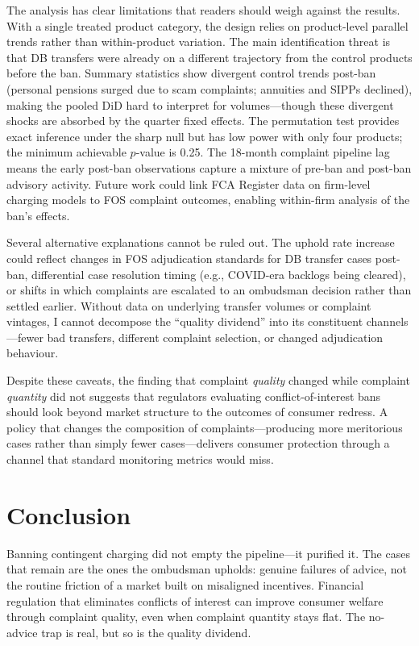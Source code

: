 \documentclass[12pt]{article}
\begin{document}
The analysis has clear limitations that readers should weigh against the results. With a single treated product category, the design relies on product-level parallel trends rather than within-product variation. The main identification threat is that DB transfers were already on a different trajectory from the control products before the ban. Summary statistics show divergent control trends post-ban (personal pensions surged due to scam complaints; annuities and SIPPs declined), making the pooled DiD hard to interpret for volumes---though these divergent shocks are absorbed by the quarter fixed effects. The permutation test provides exact inference under the sharp null but has low power with only four products; the minimum achievable $p$-value is 0.25. The 18-month complaint pipeline lag means the early post-ban observations capture a mixture of pre-ban and post-ban advisory activity. Future work could link FCA Register data on firm-level charging models to FOS complaint outcomes, enabling within-firm analysis of the ban's effects.

Several alternative explanations cannot be ruled out. The uphold rate increase could reflect changes in FOS adjudication standards for DB transfer cases post-ban, differential case resolution timing (e.g., COVID-era backlogs being cleared), or shifts in which complaints are escalated to an ombudsman decision rather than settled earlier. Without data on underlying transfer volumes or complaint vintages, I cannot decompose the ``quality dividend'' into its constituent channels---fewer bad transfers, different complaint selection, or changed adjudication behaviour.

Despite these caveats, the finding that complaint \textit{quality} changed while complaint \textit{quantity} did not suggests that regulators evaluating conflict-of-interest bans should look beyond market structure to the outcomes of consumer redress. A policy that changes the composition of complaints---producing more meritorious cases rather than simply fewer cases---delivers consumer protection through a channel that standard monitoring metrics would miss.


\section{Conclusion}

Banning contingent charging did not empty the pipeline---it purified it. The cases that remain are the ones the ombudsman upholds: genuine failures of advice, not the routine friction of a market built on misaligned incentives. Financial regulation that eliminates conflicts of interest can improve consumer welfare through complaint quality, even when complaint quantity stays flat. The no-advice trap is real, but so is the quality dividend.
\end{document}
